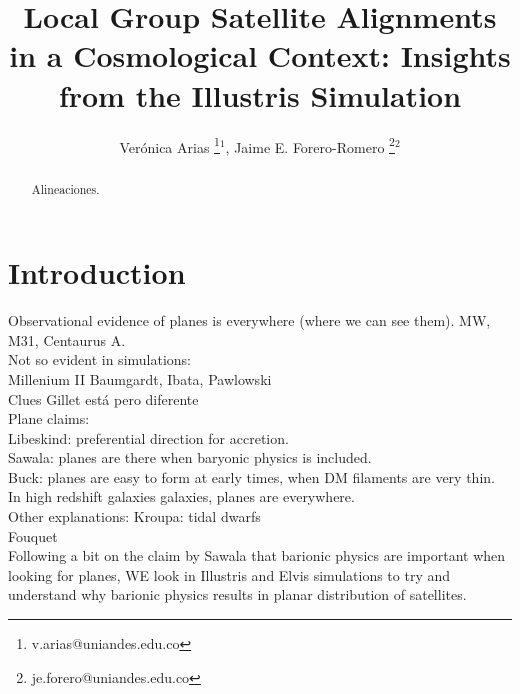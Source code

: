\documentclass{emulateapj}
\begin{document}
\title{Local Group Satellite Alignments in a Cosmological Context: Insights from the Illustris Simulation}
\author{
  Ver\'onica Arias \thanks{v.arias@uniandes.edu.co}$^{1}$,
  Jaime E. Forero-Romero \thanks{je.forero@uniandes.edu.co}$^{2}$ 
}





\begin{abstract}
Alineaciones.
\end{abstract}


\section{Introduction}

Observational evidence of planes is everywhere (where we can see them). MW, M31, Centaurus A.\\

Not so evident in simulations:\\

Millenium II Baumgardt, Ibata, Pawlowski\\

Clues Gillet está pero diferente\\

Plane claims:\\
Libeskind: preferential direction for accretion.\\
Sawala: planes are there when baryonic physics is included.\\
Buck: planes are easy to form at early times, when DM filaments are very thin. In high redshift galaxies galaxies, planes are everywhere.\\

Other explanations: Kroupa: tidal dwarfs\\
Fouquet\\



 
Following a bit on the claim by Sawala that barionic physics are important when looking for planes, WE look in Illustris and Elvis simulations to try and understand why barionic physics results in planar distribution of satellites.
\end{document}
